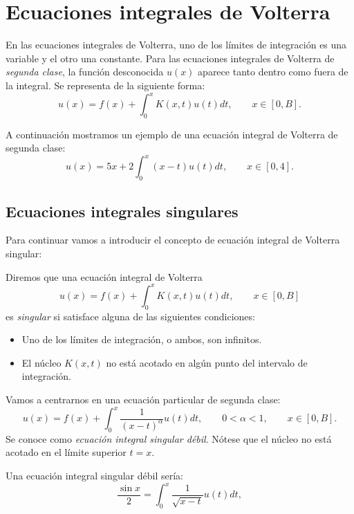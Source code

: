 \section{Ecuaciones integrales de Volterra}
En las ecuaciones integrales de Volterra, uno de los límites de integración es una variable y el otro una constante. Para las ecuaciones integrales de Volterra de \textit{segunda clase}, la función desconocida $u(x)$ aparece tanto dentro como fuera de la integral. Se representa de la siguiente forma:
\begin{equation}\label{eq:volterra}
	u(x) = f(x) + \int_0^x K(x,t)u(t)dt, \qquad x \in [0,B].
\end{equation}
\begin{ejemplo}
	A continuación mostramos un ejemplo de una ecuación integral de Volterra de segunda clase:
	\begin{equation}\label{}
		u(x) = 5x + 2\int_0^x (x-t)u(t)dt, \qquad x \in [0,4].
	\end{equation}	
\end{ejemplo}
\subsection{Ecuaciones integrales singulares}
Para continuar vamos a introducir el concepto de ecuación integral de Volterra singular:
\begin{definicion}
	Diremos que una ecuación integral de Volterra
	\begin{equation}
		u(x) = f(x) + \int_0^x K(x,t)u(t)dt, \qquad x \in [0,B]
	\end{equation}
	es \textit{singular} si satisface alguna de las siguientes condiciones:
	\begin{itemize}
		\item Uno de los límites de integración, o ambos, son infinitos.
		\item El núcleo $K(x,t)$ no está acotado en algún punto del intervalo de integración.
	\end{itemize}
\end{definicion}
Vamos a centrarnos en una ecuación particular de segunda clase:
\begin{equation}\label{}
	u(x) = f(x) + \int_0^x \dfrac{1}{(x-t)^\alpha}u(t)dt, \qquad 0 < \alpha < 1, \qquad x \in [0,B].
\end{equation}
Se conoce como \textit{ecuación integral singular débil}. Nótese que el núcleo no está acotado en el límite superior $t = x$. 
\begin{ejemplo}
	Una ecuación integral singular débil sería:
	\begin{equation}\label{}
		\dfrac{\sin x}{2} = \int_0^x \dfrac{1}{\sqrt{x-t}}u(t)dt,
	\end{equation}
\end{ejemplo}

